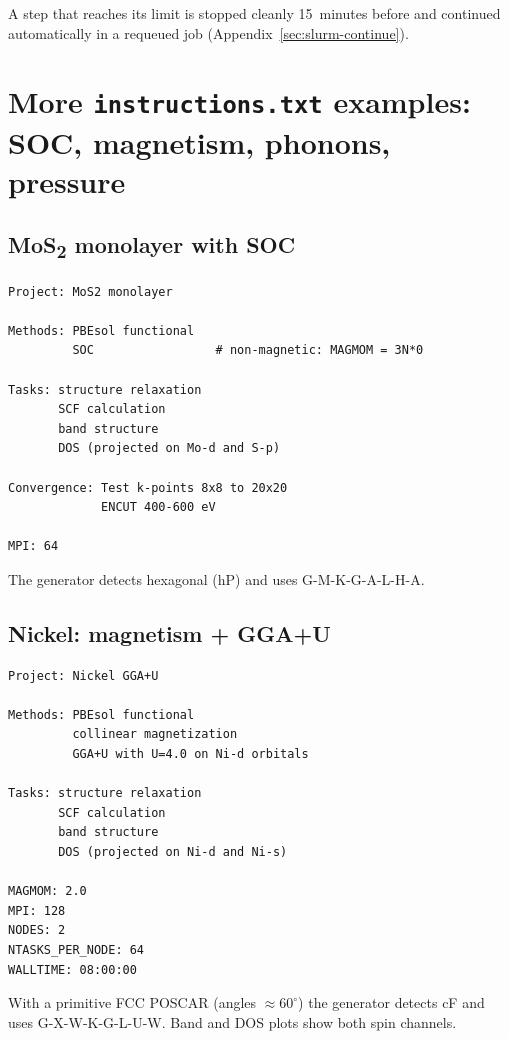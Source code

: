 \documentclass[11pt,a4paper]{scrartcl}
\begin{document}
A step that reaches its limit is stopped cleanly 15~minutes before and continued automatically in a requeued job (Appendix~\ref{sec:slurm-continue}).

\section{More \texttt{instructions.txt} examples: SOC, magnetism, phonons, pressure}
\label{sec:examples}

\subsection{MoS\textsubscript{2} monolayer with SOC}

\begin{lstlisting}
Project: MoS2 monolayer

Methods: PBEsol functional
         SOC                 # non-magnetic: MAGMOM = 3N*0

Tasks: structure relaxation
       SCF calculation
       band structure
       DOS (projected on Mo-d and S-p)

Convergence: Test k-points 8x8 to 20x20
             ENCUT 400-600 eV

MPI: 64
\end{lstlisting}

The generator detects hexagonal (hP) and uses G-M-K-G-A-L-H-A.

\subsection{Nickel: magnetism + GGA+U}

\begin{lstlisting}
Project: Nickel GGA+U

Methods: PBEsol functional
         collinear magnetization
         GGA+U with U=4.0 on Ni-d orbitals

Tasks: structure relaxation
       SCF calculation
       band structure
       DOS (projected on Ni-d and Ni-s)

MAGMOM: 2.0
MPI: 128
NODES: 2
NTASKS_PER_NODE: 64
WALLTIME: 08:00:00
\end{lstlisting}

With a primitive FCC POSCAR (angles $\approx 60^\circ$) the generator
detects cF and uses G-X-W-K-G-L-U-W.  Band and DOS plots show both spin
channels.
\end{document}

